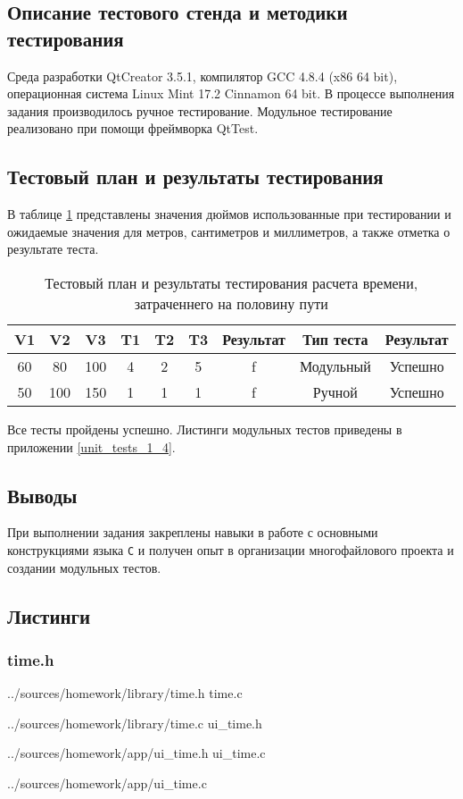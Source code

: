 \documentclass[12pt,a4paper]{report}
\begin{document}
\subsection{Описание тестового стенда и методики тестирования}
\hspace{\parindent}Среда разработки QtCreator 3.5.1, компилятор GCC 4.8.4 (x86 64 bit), операционная система Linux Mint 17.2 Cinnamon 64 bit.
В процессе выполнения задания производилось ручное тестирование.
Модульное тестирование реализовано при помощи фреймворка QtTest.

\subsection{Тестовый план и результаты тестирования}
\hspace{\parindent}В таблице \ref{time_test_plan} представлены значения дюймов использованные при тестировании и ожидаемые значения для метров, сантиметров и миллиметров, а также отметка о результате теста.
\FloatBarrier
\begin{table}[h]
\caption{Тестовый план и результаты тестирования расчета времени, затраченнего на половину пути}
\label{time_test_plan}
\begin{tabular}{| c c c | c c c | c | c | c |}
\hline 
V1 & V2 & V3 & T1 & T2 & T3 & Результат & Тип теста & Результат \\ 
\hline 
60 & 80 & 100 & 4 & 2 & 5 & f & Модульный & Успешно \\ 
\hline 
50 & 100 & 150 & 1 & 1 & 1 & f & Ручной & Успешно \\ 
\hline 
\end{tabular} 
\end{table}
\FloatBarrier
Все тесты пройдены успешно. Листинги модульных тестов приведены в приложении \ref{unit_tests_1_4}.
\subsection{Выводы}
\hspace{\parindent}При выполнении задания закреплены навыки в работе с основными конструкциями языка \verb+C+ и получен опыт в организации многофайлового проекта и создании модульных тестов.

\newpage
\subsection*{Листинги}
\subsubsection*{time.h}

{../sources/homework/library/time.h}
time.c

{../sources/homework/library/time.c}
ui\_time.h

{../sources/homework/app/ui_time.h}
ui\_time.c

{../sources/homework/app/ui_time.c}
\newpage
\end{document}
